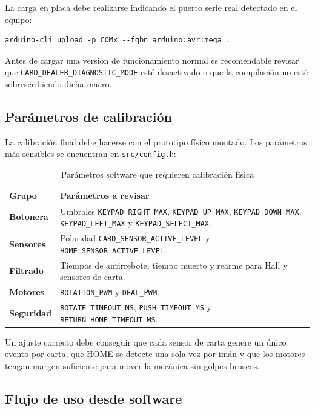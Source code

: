 La carga en placa debe realizarse indicando el puerto serie real detectado en el equipo:

\begin{verbatim}
arduino-cli upload -p COMx --fqbn arduino:avr:mega .
\end{verbatim}

Antes de cargar una versión de funcionamiento normal es recomendable revisar que \texttt{CARD\_DEALER\_DIAGNOSTIC\_MODE} esté desactivado o que la compilación no esté sobrescribiendo dicha macro.

\subsection{Parámetros de calibración}

La calibración final debe hacerse con el prototipo físico montado. Los parámetros más sensibles se encuentran en \texttt{src/config.h}:

\begin{table}[H]
\centering
\small
\begin{tabularx}{\textwidth}{>{\bfseries}p{}X}
\hline
\textbf{Grupo} & \textbf{Parámetros a revisar} \\
\hline
Botonera & Umbrales \texttt{KEYPAD\_RIGHT\_MAX}, \texttt{KEYPAD\_UP\_MAX}, \texttt{KEYPAD\_DOWN\_MAX}, \texttt{KEYPAD\_LEFT\_MAX} y \texttt{KEYPAD\_SELECT\_MAX}. \\
Sensores & Polaridad \texttt{CARD\_SENSOR\_ACTIVE\_LEVEL} y \texttt{HOME\_SENSOR\_ACTIVE\_LEVEL}. \\
Filtrado & Tiempos de antirrebote, tiempo muerto y rearme para Hall y sensores de carta. \\
Motores & \texttt{ROTATION\_PWM} y \texttt{DEAL\_PWM}. \\
Seguridad & \texttt{ROTATE\_TIMEOUT\_MS}, \texttt{PUSH\_TIMEOUT\_MS} y \texttt{RETURN\_HOME\_TIMEOUT\_MS}. \\
\hline
\end{tabularx}
\caption{Parámetros software que requieren calibración física}
\label{tab:calibration}
\end{table}

Un ajuste correcto debe conseguir que cada sensor de carta genere un único evento por carta, que HOME se detecte una sola vez por imán y que los motores tengan margen suficiente para mover la mecánica sin golpes bruscos.

\subsection{Flujo de uso desde software}

